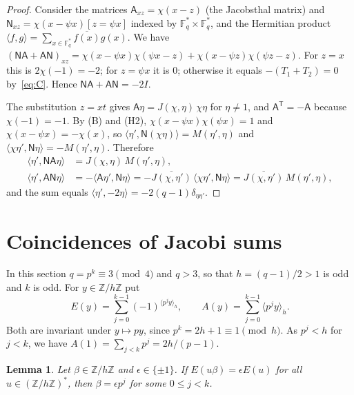 \documentclass[11pt]{amsart}
\newtheorem{lemma}[theorem]{Lemma}
\theoremstyle{definition}
\theoremstyle{remark}
\numberwithin{equation}{section}
\newcommand{\Fs}{\mathbb{F}_q^{*}}
\newcommand{\Z}{\mathbb{Z}}
\newcommand{\res}[2]{\langle #1\rangle_{#2}}
\newcommand{\conj}[1]{\overline{#1}}
\newcommand{\mA}{\mathsf{A}}
\newcommand{\mN}{\mathsf{N}}
\begin{document}
\begin{proof}
Consider the matrices $\mA_{xz}=\chi(x-z)$ (the Jacobsthal matrix) and $\mN_{xz}=\chi(x-\psi x)[z=\psi x]$ indexed by $\Fs\times\Fs$,
and the Hermitian product $\langle f,g\rangle=\sum_{x\in\Fs}\conj{f(x)}g(x)$. We have
$(\mN\mA+\mA\mN)_{xz}=\chi(x-\psi x)\chi(\psi x-z)+\chi(x-\psi z)\chi(\psi z-z)$. For $z=x$ this is $2\chi(-1)=-2$; for $z=\psi x$
it is $0$; otherwise it equals $-(T_1+T_2)=0$ by~\eqref{eq:C}. Hence $\mN\mA+\mA\mN=-2I$.

The substitution $z=xt$ gives $\mA\eta=J(\chi,\eta)\,\chi\eta$ for $\eta\ne1$, and $\mA^{\mathsf T}=-\mA$ because $\chi(-1)=-1$. By
(B) and (H2), $\chi(x-\psi x)\chi(\psi x)=1$ and $\chi(x-\psi x)=-\chi(x)$, so $\langle\eta',\mN(\chi\eta)\rangle=M(\eta',\eta)$ and
$\langle\chi\eta',\mN\eta\rangle=-M(\eta',\eta)$. Therefore
\[
\begin{aligned}
\langle\eta',\mN\mA\eta\rangle&=J(\chi,\eta)\,M(\eta',\eta),\\
\langle\eta',\mA\mN\eta\rangle&=-\langle\mA\eta',\mN\eta\rangle=-\conj{J(\chi,\eta')}\,\langle\chi\eta',\mN\eta\rangle
=\conj{J(\chi,\eta')}\,M(\eta',\eta),
\end{aligned}
\]
and the sum equals $\langle\eta',-2\eta\rangle=-2(q-1)\delta_{\eta\eta'}$.
\end{proof}

\section{Coincidences of Jacobi sums}\label{sec:stickel}

In this section $q=p^k\equiv3\pmod 4$ and $q>3$, so that $h=(q-1)/2>1$ is odd and $k$ is odd. For $y\in\Z/h\Z$ put
\[
E(y)=\sum_{j=0}^{k-1}(-1)^{\res{p^jy}{h}},\qquad A(y)=\sum_{j=0}^{k-1}\res{p^jy}{h}.
\]
Both are invariant under $y\mapsto py$, since $p^k=2h+1\equiv1\pmod h$. As $p^j<h$ for $j<k$, we have $A(1)=\sum_{j<k}p^j=2h/(p-1)$.

\begin{lemma}\label{lem:L}
Let $\beta\in\Z/h\Z$ and $\epsilon\in\{\pm1\}$. If $E(u\beta)=\epsilon E(u)$ for all $u\in(\Z/h\Z)^*$, then $\beta=\epsilon p^j$ for some
$0\le j<k$.
\end{lemma}
\end{document}
